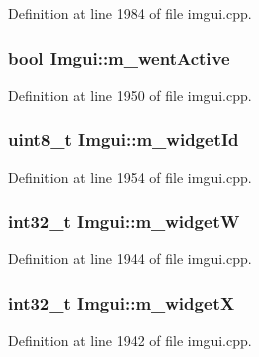 Definition at line 1984 of file imgui.\+cpp.

\hypertarget{struct_imgui_a65c4171e4ded77458c189fd935b1fe36}{
\subsubsection[{m\+\_\+went\+Active}]{\setlength{\rightskip}{0pt plus 5cm}bool Imgui\+::m\+\_\+went\+Active}}\label{struct_imgui_a65c4171e4ded77458c189fd935b1fe36}


Definition at line 1950 of file imgui.\+cpp.

\hypertarget{struct_imgui_ab53ae39e3d5f0b9e95c40ed5f6167f2c}{
\subsubsection[{m\+\_\+widget\+Id}]{\setlength{\rightskip}{0pt plus 5cm}uint8\+\_\+t Imgui\+::m\+\_\+widget\+Id}}\label{struct_imgui_ab53ae39e3d5f0b9e95c40ed5f6167f2c}


Definition at line 1954 of file imgui.\+cpp.

\hypertarget{struct_imgui_a09be3810b97464e9ec9d4d8883d1aca3}{
\subsubsection[{m\+\_\+widget\+W}]{\setlength{\rightskip}{0pt plus 5cm}int32\+\_\+t Imgui\+::m\+\_\+widget\+W}}\label{struct_imgui_a09be3810b97464e9ec9d4d8883d1aca3}


Definition at line 1944 of file imgui.\+cpp.

\hypertarget{struct_imgui_aa21d6fd70766cb804e86ddb341c1b689}{
\subsubsection[{m\+\_\+widget\+X}]{\setlength{\rightskip}{0pt plus 5cm}int32\+\_\+t Imgui\+::m\+\_\+widget\+X}}\label{struct_imgui_aa21d6fd70766cb804e86ddb341c1b689}


Definition at line 1942 of file imgui.\+cpp.

